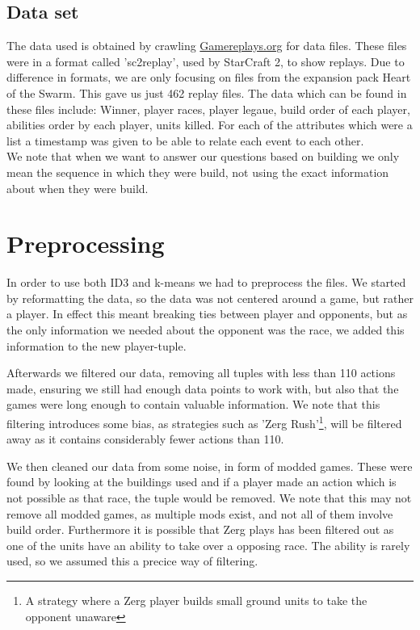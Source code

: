 \documentclass[a4paper,11pt]{article}
\begin{document}
\subsection{Data set}
The data used is obtained by crawling \url{Gamereplays.org} for data files.
These files were in a format called 'sc2replay', used by StarCraft 2, to show replays. Due to difference in formats, we are only focusing on files from the expansion pack Heart of the Swarm. This gave us just 462 replay files. The data which can be found in these files include: Winner, player races, player legaue, build order of each player, abilities order by each player, units killed.
For each of the attributes which were a list a timestamp was given to be able to relate each event to each other.\\

We note that when we want to answer our questions based on building we only mean the sequence in which they were build, not using the exact information about when they were build.

\section{Preprocessing}
In order to use both ID3 and k-means we had to preprocess the files. We started by reformatting the data, so the data was not centered around a game, but rather a player.
In effect this meant breaking ties between player and opponents, but as the only information we needed about the opponent was the race, we added this information to the new player-tuple.

Afterwards we filtered our data, removing all tuples with less than 110 actions made, ensuring we still had enough data points to work with, but also that the games were long enough to contain valuable information. We note that this filtering introduces some bias, as strategies such as 'Zerg Rush'\footnote{A strategy where a Zerg player builds small ground units to take the opponent unaware}, will be filtered away as it contains considerably fewer actions than 110.

We then cleaned our data from some noise, in form of modded games. These were found by looking at the buildings used and if a player made an action which is not possible as that race, the tuple would be removed. We note that this may not remove all modded games, as multiple mods exist, and not all of them involve build order. Furthermore it is possible that Zerg plays has been filtered out as one of the units have an ability to take over a opposing race. The ability is rarely used, so we assumed this a precice way of filtering.
\end{document}
